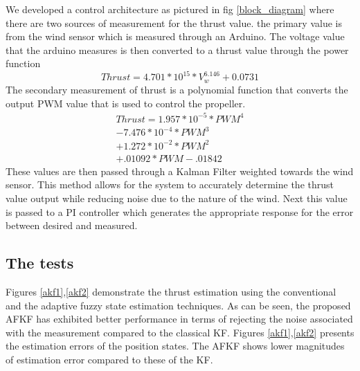 \documentclass[conference]{IEEEtran}
\begin{document}
	We developed a control architecture as pictured in fig \ref{block_diagram} where there are two sources of measurement for the thrust value. the primary value is from the wind sensor which is measured through an Arduino. The voltage value that the arduino measures is then converted to a thrust value through the power function
	\begin{equation}
	Thrust = 4.701 * 10^{15} * V_w^{6.146} + 0.0731
	\label{wind_power}
	\end{equation}
	The secondary measurement of thrust is a polynomial function that converts the output PWM value that is used to control the propeller. \newline
	\begin{eqnarray}
	Thrust = 1.957*10^{-5}*PWM^4 \\
	- 7.476*10^{-4}*PWM^3 \nonumber\\ 
	+ 1.272*10^{-2}*PWM^2 \nonumber\\
	+ .01092*PWM - .01842 \nonumber
	\label{pwm_poly}
	\end{eqnarray}
	These values are then passed through a Kalman Filter weighted towards the wind sensor. This method allows for the system to accurately determine the thrust value output while reducing noise due to the nature of the wind. Next this value is passed to a PI controller which generates the appropriate response for the error between desired and measured. 
	\subsection{The tests}
	Figures \ref{akf1},\ref{akf2} demonstrate the thrust estimation using the conventional and the adaptive fuzzy state estimation techniques. As can be seen, the proposed AFKF has exhibited better performance in terms of rejecting the noise associated with the measurement compared to the classical KF. Figures \ref{akf1},\ref{akf2} presents the estimation errors of the position states. The AFKF shows lower magnitudes of estimation error compared to these of the KF. 
	
\end{document}
